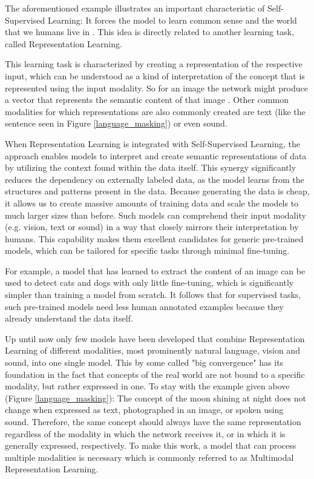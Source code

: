 The aforementioned example illustrates an important characteristic of Self-Supervised Learning:
It forces the model to learn common sense and the world that we humans live in \cite{lecun}.
This idea is directly related to another learning task, called Representation Learning.

This learning task is characterized by creating a representation of the respective input,
which can be understood as a kind of interpretation of the concept that is represented using 
the input modality. So for an image the network might produce a vector that represents the semantic 
content of that image \cite{wu}\cite{he}\cite{chen}. Other common modalities for which representations
are also commonly created are text (like the sentence seen in Figure \ref{language_masking}) or even sound.

When Representation Learning is integrated with Self-Supervised Learning,
the approach enables models to interpret and create semantic representations
of data by utilizing the context found within the data itself.
This synergy significantly reduces the dependency on externally labeled data,
as the model learns from the structures and patterns present in the data.
Because generating the data is cheap, it allows us to create massive amounts of
training data and scale the models to much larger sizes than before.
Such models can comprehend their input modality (e.g. vision, text or sound) in a way that
closely mirrors their interpretation by humans. This capability makes them excellent candidates for
generic pre-trained models, which can be tailored for specific tasks
through minimal fine-tuning.

For example, a model that has learned to extract the content of an image can be used
to detect cats and dogs with only little fine-tuning, which is significantly simpler than
training a model from scratch.
It follows that for supervised tasks, such pre-trained models need less human annotated examples 
because they already understand the data itself.

Up until now only few models have been developed that combine Representation Learning
of different modalities, most prominently natural language, vision and sound, into one single model.
This by some called "big convergence" \cite{wang} has its foundation in the fact
that concepts of the real world are not bound to a specific modality, but rather
expressed in one.
To stay with the example given above (Figure \ref{language_masking}): The concept of the moon shining 
at night does not change when expressed as text, photographed in an image, or spoken using sound.
Therefore, the same concept should always have the same representation regardless of the modality
in which the network receives it, or in which it is generally expressed, respectively.
To make this work, a model that can process multiple modalities is necessary which is
commonly referred to as Multimodal Representation Learning.

